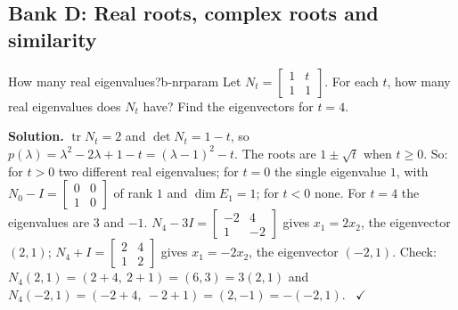 \documentclass[11pt]{article}
\begin{document}
\subsection*{Bank D: Real roots, complex roots and similarity}
\begin{exmp}{How many real eigenvalues?}{b-nrparam}
Let $N_t=\begin{bmatrix}1&t\\1&1\end{bmatrix}$. For each $t$, how many real eigenvalues does $N_t$ have? Find the eigenvectors for $t=4$.

\textbf{Solution.} $\operatorname{tr}N_t=2$ and $\det N_t=1-t$, so $p(\lambda)=\lambda^2-2\lambda+1-t=(\lambda-1)^2-t$. The roots are $1\pm\sqrt t$ when $t\ge0$. So: for $t>0$ two different real eigenvalues; for $t=0$ the single eigenvalue $1$, with $N_0-I=\begin{bmatrix}0&0\\1&0\end{bmatrix}$ of rank $1$ and $\dim E_1=1$; for $t<0$ none. For $t=4$ the eigenvalues are $3$ and $-1$. $N_4-3I=\begin{bmatrix}-2&4\\1&-2\end{bmatrix}$ gives $x_1=2x_2$, the eigenvector $(2,1)$; $N_4+I=\begin{bmatrix}2&4\\1&2\end{bmatrix}$ gives $x_1=-2x_2$, the eigenvector $(-2,1)$. Check: $N_4(2,1)=(2+4,\ 2+1)=(6,3)=3(2,1)$ and $N_4(-2,1)=(-2+4,\ -2+1)=(2,-1)=-(-2,1)$. \ $\checkmark$
\end{exmp}
\end{document}
